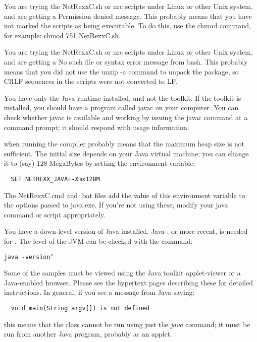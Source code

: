 \begin{description}
\item[Permission Denied] You are trying the NetRexxC.sh or nrc scripts under Linux or other Unix system, and are getting a Permission denied message. This probably means that you have not marked the scripts as being executable. To do this, use the chmod command, for example: chmod 751 NetRexxC.sh.
\item[No such file]  You are trying the NetRexxC.sh or nrc scripts under Linux or other Unix system, and are getting a No such file or syntax error message from bash. This probably means that you did not use the unzip -a command to unpack the \nr{} package, so CRLF sequences in the scripts were not converted to LF.
\item You have only the Java runtime installed, and not the toolkit. If the toolkit is installed, you should have a program called javac on your computer. You can check whether javac is available and working by issuing the javac command at a command prompt; it should respond with usage information.
\item[java.lang.OutOfMemoryError] when running the compiler probably means that the maximum heap size is not sufficient. The initial size depends on your Java virtual machine; you can change it to (say) 128 MegaBytes by setting the environment variable:
\begin{verbatim}
  SET NETREXX_JAVA=-Xmx128M
\end{verbatim}
The NetRexxC.cmd and .bat files add the value of this environment variable to the options passed to java.exe. If you're not using these, modify your java command or script appropriately.
\item[Down-level Java]  You have a down-level version of Java installed. Java \minimalJVMversion{}, or more recent, is needed for \nr{}. The level of the JVM can be checked with the command:
\begin{verbatim}
java -version’
\end{verbatim}
\item[applet viewer needed] Some of the samples must be viewed using the Java toolkit applet-viewer or a Java-enabled browser. Please see the hypertext pages describing these for detailed instructions. In general, if you see a message from Java saying:
\begin{verbatim}
  void main(String argv[]) is not defined
\end{verbatim}
this means that the class cannot be run using just the \emph{java} command; it must be run from another Java program, probably as an applet.
\end{description} 